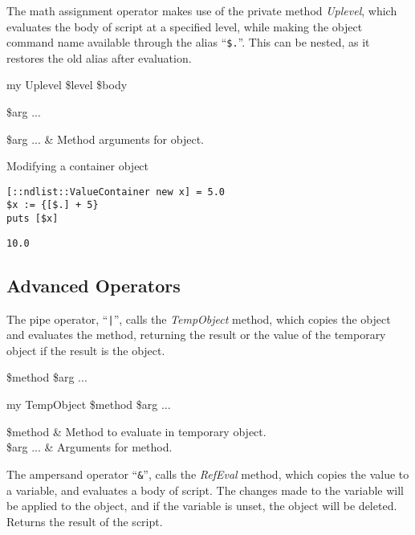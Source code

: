 The math assignment operator makes use of the private method \textit{Uplevel}, which evaluates the body of script at a specified level, while making the object command name available through the alias ``\texttt{\$.}''. This can be nested, as it restores the old alias after evaluation.
\begin{syntax}
my Uplevel \$level \$body
\end{syntax}

\begin{syntax}
 \$arg ...
\end{syntax}
\begin{args}
\$arg ... & Method arguments for object.
\end{args}

\begin{example}{Modifying a container object}
\begin{lstlisting}
[::ndlist::ValueContainer new x] = 5.0
$x := {[$.] + 5}
puts [$x]
\end{lstlisting}
\tcblower
\begin{lstlisting}
10.0
\end{lstlisting}
\end{example}

\clearpage
\subsection{Advanced Operators}
The pipe operator, ``\texttt{|}'', calls the \textit{TempObject} method, which copies the object and evaluates the method, returning the result or the value of the temporary object if the result is the object.
\begin{syntax}
 \$method \$arg ... 
\end{syntax}
\begin{syntax}
my TempObject \$method \$arg ...
\end{syntax}

\begin{args}
\$method & Method to evaluate in temporary object. \\
\$arg ... & Arguments for method.
\end{args}

The ampersand operator ``\texttt{\&}'', calls the \textit{RefEval} method, which copies the value to a variable, and evaluates a body of script. 
The changes made to the variable will be applied to the object, and if the variable is unset, the object will be deleted.
Returns the result of the script.


